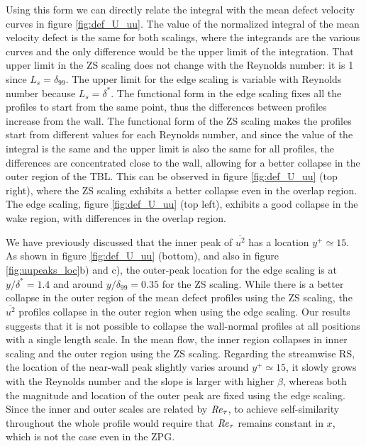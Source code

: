 Using this form we can directly relate the integral with the mean defect velocity curves in figure \ref{fig:def_U_uu}. 
 The value of the normalized integral of the mean velocity defect is the same for both scalings, where the integrands are the various curves and the only difference would be the upper limit of the integration. That upper limit in the ZS scaling does not change with the Reynolds number: it is 1 since $L_s=\delta_{99}$. The upper limit for the edge scaling is variable with Reynolds number because $L_s=\delta^*$. 
The functional form in the edge scaling fixes all the profiles to start from the same point, thus the differences between profiles increase from the wall. The functional form of the ZS scaling makes the profiles start from different values for each Reynolds number, and since the value of the integral is the same and the upper limit is also the same for all profiles, the differences are concentrated close to the wall, allowing for a better collapse in the outer region of the TBL.
This can be observed in figure \ref{fig:def_U_uu} (top right), where the ZS scaling exhibits a better collapse even in the overlap region. 
The edge scaling, figure \ref{fig:def_U_uu} (top left), exhibits a good collapse in the wake region, with differences in the overlap region.


We have previously discussed that the inner peak of $\overline{u^2}$ has a location $y^+ \simeq 15$. As shown in figure \ref{fig:def_U_uu} (bottom), and also in figure \ref{fig:uupeaks_loc}b) and c), the outer-peak location for the edge scaling is at $y/\delta^*=1.4$ and around $y/\delta_{99}=0.35$ for the ZS scaling.
While there is a better collapse in the outer region of the mean defect profiles using the ZS scaling, the $\overline{u^2}$ profiles collapse in the outer region when using the edge scaling.
Our results suggests that it is not possible to collapse the wall-normal profiles at all positions 
with a single length scale. In the mean flow, the inner region collapses in inner scaling and the outer region using the ZS scaling. Regarding the streamwise RS, the location of the near-wall peak slightly varies around $y^+\simeq 15$, it slowly grows with the Reynolds number and the slope is larger with higher $\beta$, whereas both the magnitude and location of the outer peak are fixed using the edge scaling. 
Since the inner and outer scales are related by $\mbox{\textit{Re}}_{\tau}$, to achieve self-similarity throughout the whole profile would require that $\mbox{\textit{Re}}_{\tau}$ remains constant in $x$, which is not the case even in the ZPG. 

